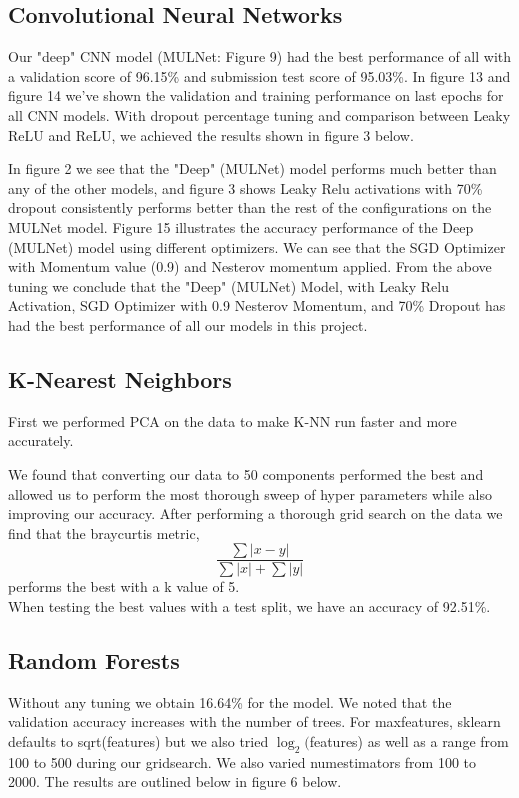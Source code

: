 \documentclass[twoside,twocolumn]{article}
\begin{document}
\subsection{Convolutional Neural Networks}

Our "deep" CNN model (MULNet: Figure 9) had the best performance of all with a validation score of 96.15\% and submission test score of 95.03\%. In figure 13 and figure 14 we've shown the validation and training performance on last epochs for all CNN models. With dropout percentage tuning and comparison between Leaky ReLU and ReLU, we achieved the results shown in figure 3 below.

In figure 2 we see that the "Deep" (MULNet) model performs much better than any of the other models, and figure 3 shows Leaky Relu activations with 70\% dropout consistently performs better than the rest of the configurations on the MULNet model. Figure 15 illustrates the accuracy performance of the Deep (MULNet) model using different optimizers. We can see that the SGD Optimizer with Momentum value (0.9) and Nesterov momentum applied. From the above tuning we conclude that the "Deep" (MULNet) Model, with Leaky Relu Activation, SGD Optimizer with 0.9 Nesterov Momentum, and 70\% Dropout has had the best performance of all our models in this project. 
\subsection{K-Nearest Neighbors}
First we performed PCA on the data to make K-NN run faster and more accurately. 

We found that converting our data to 50 components performed the best and allowed us to perform the most thorough sweep of hyper parameters while also improving our accuracy. After performing a thorough grid search on the data we find that the braycurtis metric, $$\frac{\sum{|x-y|}}{\sum{|x|} + \sum{|y|}}$$ performs the best with a k value of 5. \\

When testing the best values with a test split, we have an accuracy of 92.51\%.
\subsection{Random Forests}
Without any tuning we obtain 16.64\% for the model. We noted that the validation accuracy increases with the number of trees. For max\textunderscore features, sklearn defaults to sqrt(features) but we also tried $\log_2($features) as well as a range from 100 to 500 during our gridsearch. We also varied num\textunderscore estimators from 100 to 2000. The results are outlined below in figure 6 below.
\end{document}
